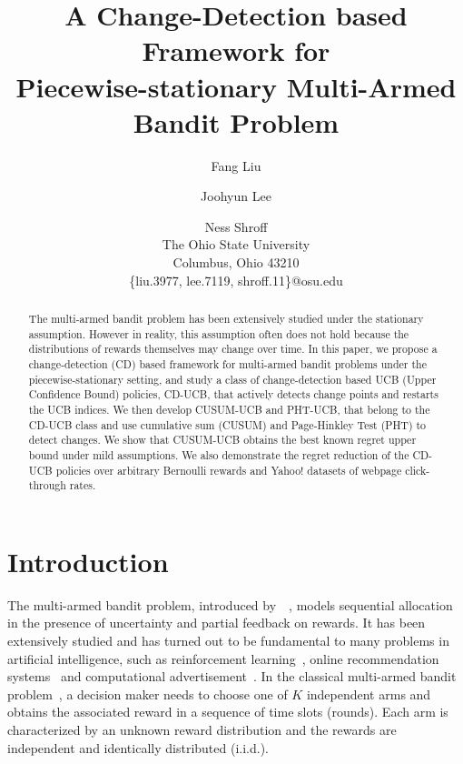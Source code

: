 \documentclass[letterpaper]{article} %
\begin{document}
%
\title{A Change-Detection based Framework for\\ Piecewise-stationary Multi-Armed Bandit Problem}
\author{Fang Liu \and Joohyun Lee \and Ness Shroff\\
The Ohio State University\\
Columbus, Ohio 43210\\
\{liu.3977, lee.7119, shroff.11\}@osu.edu\\
}
\maketitle
\begin{abstract}
The multi-armed bandit problem has been extensively studied under the stationary assumption. However in reality, this assumption often does not hold because the distributions of rewards themselves may change over time. In this paper, we propose a change-detection (CD) based framework for multi-armed bandit problems under the piecewise-stationary setting, and study a class of change-detection based UCB (Upper Confidence Bound) policies, CD-UCB, that actively detects change points and restarts the UCB indices. We then develop CUSUM-UCB and PHT-UCB, that belong to the CD-UCB class and use cumulative sum (CUSUM) and Page-Hinkley Test (PHT) to detect changes. We show that CUSUM-UCB obtains the best known regret upper bound under mild assumptions. We also demonstrate the regret reduction of the CD-UCB policies over arbitrary Bernoulli rewards and Yahoo! datasets of webpage click-through rates.
\end{abstract}
\section{Introduction}
The multi-armed bandit problem, introduced by~\citeauthor{thompson1933likelihood}~, models sequential allocation in the presence of uncertainty and partial feedback on rewards. It has been extensively studied and has turned out to be fundamental to many problems in artificial intelligence, such as reinforcement learning~\cite{sutton1998reinforcement}, online recommendation systems~\cite{li2016collaborative} and computational advertisement~\cite{buccapatnam2017reward}. In the classical multi-armed bandit problem~\cite{lai1985asymptotically}, a decision maker needs to choose one of $K$ independent arms and obtains the associated reward in a sequence of time slots (rounds). Each arm is characterized by an unknown reward distribution and the rewards are independent and identically distributed (i.i.d.). %
\end{document}
